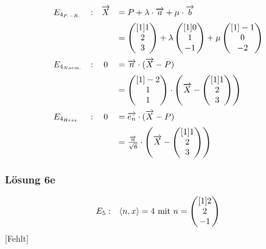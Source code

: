 \begin{equation*}
	\begin{array}{ l l c l }
		E_{4_{P.-R.}} & : & \vec{X} & =P+\lambda \cdotp \vec{a} +\mu \cdotp \vec{b}\vspace{2mm}\\
		&  &  & =\begin{pmatrix}[1]
			1\\
			2\\
			3
		\end{pmatrix} +\lambda \begin{pmatrix}[1]
			0\\
			1\\
			-1
		\end{pmatrix} +\mu \begin{pmatrix}[1]
			-1\\
			0\\
			-2
		\end{pmatrix}\vspace{2mm}\\
		E_{4_{Norm.}} & : & 0 & =\vec{n} \cdotp (\vec{X} -P)\vspace{2mm}\\
		&  &  & =\begin{pmatrix}[1]
			-2\\
			1\\
			1
		\end{pmatrix} \cdotp \left(\vec{X} -\begin{pmatrix}[1]
			1\\
			2\\
			3
		\end{pmatrix}\right)\vspace{2mm}\\
		E_{4_{Hess.}} & : & 0 & =\overrightarrow{e_{n}} \cdotp (\vec{X} -P)\vspace{2mm}\\
		&  &  & =\frac{\vec{n}}{\sqrt{6}} \cdotp \left(\vec{X} -\begin{pmatrix}[1]
			1\\
			2\\
			3
		\end{pmatrix}\right)
	\end{array}
\end{equation*}

\subsubsection{Lösung 6e}
\begin{equation*}
	\begin{array}{ r l }
		E_{5} : & \langle n,x\rangle =4\ \text{mit} \ n=\begin{pmatrix}[1]
			2\\
			2\\
			-1
		\end{pmatrix}
	\end{array}
\end{equation*}
[Fehlt]
